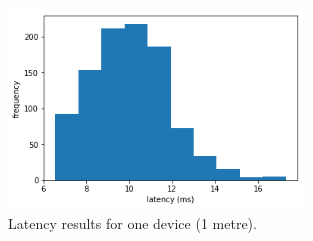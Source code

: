 \begin{figure}[htbp]
  \centering
    \includegraphics[width=0.7\textwidth]{Chapters/Figures/technical/Latency/figure4.png}
    \caption{Latency results for one device (1 metre).}
    \label{fig:latency_fig4}
\end{figure}

